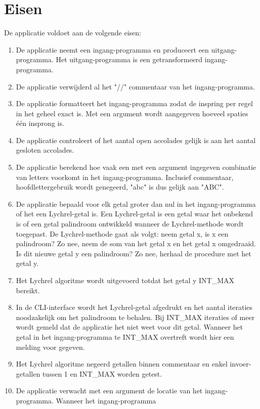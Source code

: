 \documentclass[10pt]{article}
\begin{document}
\section{Eisen}
\label{sec:eisen}
De applicatie voldoet aan de volgende eisen:
\begin{enumerate}
      \item De applicatie neemt een ingang-programma en produceert een uitgang-programma. Het uitgang-programma is een
            getransformeerd ingang-programma.
      \item De applicatie verwijderd al het "//" commentaar van het ingang-programma.
      \item De applicatie formatteert het ingang-programma zodat de inspring per regel in het geheel exact is. Met een
            argument wordt aangegeven hoeveel spaties \'e\'en insprong is.
      \item De applicatie controleert of het aantal open accolades gelijk is aan het aantal gesloten accolades.
      \item De applicatie berekend hoe vaak een met een argument ingegeven combinatie van letters voorkomt in het
            ingang-programma. Inclusief commentaar, hoofdlettergebruik wordt genegeerd, "abc" is dus gelijk aan
            "ABC".
      \item De applicatie bepaald voor elk getal groter dan nul in het ingang-programma of het een Lychrel-getal is. Een Lychrel-getal is een getal waar het onbekend is of een getal palindroom ontwikkeld wanneer de Lychrel-methode wordt toegepast. De Lychrel-methode gaat als volgt: neem getal x, is x een palindroom? Zo nee, neem de som van het getal x en het getal x omgedraaid. Is dit nieuwe getal y een palindroom? Zo nee, herhaal de procedure met het getal y.
      \item Het Lychrel algoritme wordt uitgevoerd totdat het getal y INT\_MAX bereikt.
      \item In de CLI-interface wordt het Lychrel-getal afgedrukt en het aantal
            iteraties
            noodzakelijk om het palindroom te behalen. Bij INT\_MAX iteraties of meer wordt gemeld dat de applicatie het
            niet weet voor dit
            getal. Wanneer het getal in het ingang-programma te INT\_MAX overtreft wordt hier een melding voor gegeven.
      \item Het Lychrel algoritme negeerd getallen binnen commentaar en enkel invoer-getallen tussen 1 en INT\_MAX worden getest.
      \item De applicatie verwacht met een argument de locatie van het ingang-programma. Wanneer het ingang-programma

\end{enumerate}
\end{document}
